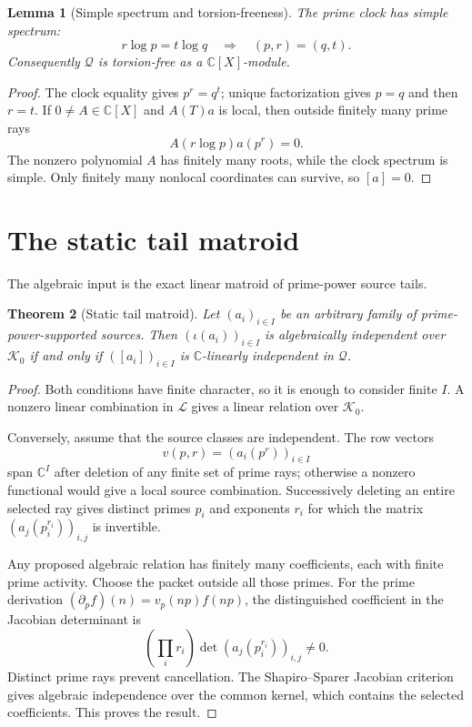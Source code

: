 \documentclass[11pt]{article}
\newtheorem{theorem}{Theorem}[section]
\newtheorem{lemma}[theorem]{Lemma}
\theoremstyle{definition}
\theoremstyle{remark}
\newcommand{\C}{\mathbb C}
\newcommand{\cK}{\mathcal K}
\newcommand{\cL}{\mathcal L}
\newcommand{\cQ}{\mathcal Q}
\begin{document}
\begin{lemma}[Simple spectrum and torsion-freeness]\label{lem:torsion-free}
The prime clock has simple spectrum:
\[
  r\log p=t\log q\quad\Longrightarrow\quad (p,r)=(q,t).
\]
Consequently \(\cQ\) is torsion-free as a \(\C[X]\)-module.
\end{lemma}

\begin{proof}
The clock equality gives \(p^r=q^t\); unique factorization gives \(p=q\) and then \(r=t\).
If \(0\neq A\in\C[X]\) and \(A(T)a\) is local, then outside finitely many prime rays
\[
  A(r\log p)a(p^r)=0.
\]
The nonzero polynomial \(A\) has finitely many roots, while the clock spectrum is simple.  Only
finitely many nonlocal coordinates can survive, so \([a]=0\).
\end{proof}

\section{The static tail matroid}\label{sec:static}

The algebraic input is the exact linear matroid of prime-power source tails.

\begin{theorem}[Static tail matroid]\label{thm:static}
Let \((a_i)_{i\in I}\) be an arbitrary family of prime-power-supported sources.  Then
\((\iota(a_i))_{i\in I}\) is algebraically independent over \(\cK_0\) if and only if
\(([a_i])_{i\in I}\) is \(\C\)-linearly independent in \(\cQ\).
\end{theorem}

\begin{proof}
Both conditions have finite character, so it is enough to consider finite \(I\).  A nonzero
linear combination in \(\cL\) gives a linear relation over \(\cK_0\).

Conversely, assume that the source classes are independent.  The row vectors
\[
  v(p,r)=(a_i(p^r))_{i\in I}
\]
span \(\C^I\) after deletion of any finite set of prime rays; otherwise a nonzero functional
would give a local source combination.  Successively deleting an entire selected ray gives
distinct primes \(p_i\) and exponents \(r_i\) for which the matrix
\((a_j(p_i^{r_i}))_{i,j}\) is invertible.

Any proposed algebraic relation has finitely many coefficients, each with finite prime activity.
Choose the packet outside all those primes.  For the prime derivation
\((\partial_p f)(n)=v_p(np)f(np)\), the distinguished coefficient in the Jacobian determinant is
\[
  \left(\prod_i r_i\right)\det(a_j(p_i^{r_i}))_{i,j}\neq0.
\]
Distinct prime rays prevent cancellation.  The Shapiro--Sparer Jacobian criterion
\cite[Theorem~3.1]{ShapiroSparer} gives algebraic independence over the common kernel, which
contains the selected coefficients.  This proves the result.
\end{proof}
\end{document}
